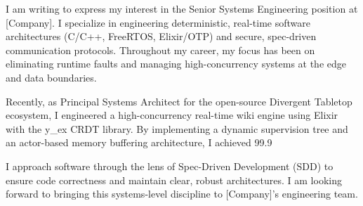 \documentclass[12pt, a4paper]{awesome-cv}
\begin{document}
\makecvheader[R]


\makelettertitle

\begin{cvletter}


  I am writing to express my interest in the Senior Systems Engineering position at [Company]. I specialize in engineering deterministic, real-time software architectures (C/C++, FreeRTOS, Elixir/OTP) and secure, spec-driven communication protocols. Throughout my career, my focus has been on eliminating runtime faults and managing high-concurrency systems at the edge and data boundaries.


  Recently, as Principal Systems Architect for the open-source Divergent Tabletop ecosystem, I engineered a high-concurrency real-time wiki engine using Elixir with the y_ex CRDT library. By implementing a dynamic supervision tree and an actor-based memory buffering architecture, I achieved 99.9%


  I approach software through the lens of Spec-Driven Development (SDD) to ensure code correctness and maintain clear, robust architectures. I am looking forward to bringing this systems-level discipline to [Company]'s engineering team.

\end{cvletter}

\makeletterclosing
\end{document}
